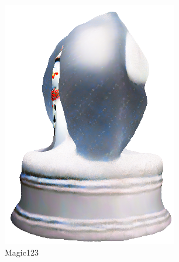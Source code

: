 \begin{figure}[ht]
\begin{subfigure}[b]{0.22\textwidth}
        \includegraphics[width=\textwidth]{etc/a detailed rendering of a snow globe containing a snowman/magic123/it10000-3.png}
        \vspace{0.1cm}
        \caption{Magic123}
    \end{subfigure}
    \begin{subfigure}[b]{0.25\textwidth}
        \centering

\end{subfigure}
\end{figure}
